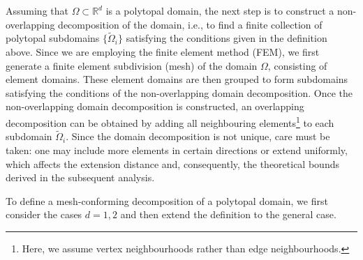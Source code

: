 Assuming that $\Omega \subset \mathbb{R}^{d}$ is a polytopal domain, the next step is to construct a non-overlapping decomposition of the domain, i.e., to find a finite collection of polytopal subdomains $\{\widetilde{\Omega}_{i}\}$ satisfying the conditions given in the definition above. Since we are employing the finite element method (FEM), we first generate a finite element subdivision (mesh) of the domain $\Omega$, consisting of element domains. These element domains are then grouped to form subdomains satisfying the conditions of the non-overlapping domain decomposition. Once the non-overlapping domain decomposition is constructed, an overlapping decomposition can be obtained by adding all neighbouring elements\footnote{Here, we assume vertex neighbourhoods rather than edge neighbourhoods.} to each subdomain $\widetilde{\Omega}_{i}$. Since the domain decomposition is not unique, care must be taken: one may include more elements in certain directions or extend uniformly, which affects the extension distance and, consequently, the theoretical bounds derived in the subsequent analysis.

To define a mesh-conforming decomposition of a polytopal domain, we first consider the cases $d = 1, 2$ and then extend the definition to the general case.

